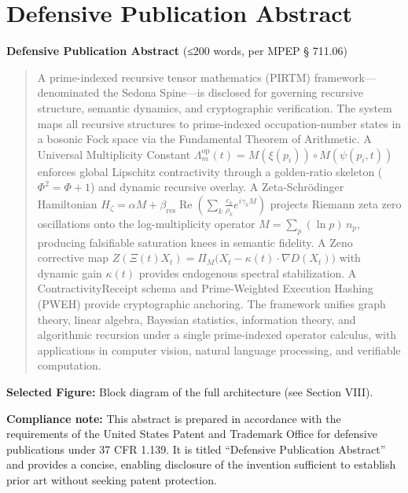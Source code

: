\documentclass[12pt]{article}
\theoremstyle{plain}
\theoremstyle{definition}
\theoremstyle{remark}
\begin{document}
\section{Defensive Publication Abstract}

\textbf{Defensive Publication Abstract} (≤200 words, per MPEP § 711.06)

\begin{quote}
A prime-indexed recursive tensor mathematics (PIRTM) framework—denominated the Sedona Spine—is disclosed for governing recursive structure, semantic dynamics, and cryptographic verification. The system maps all recursive structures to prime-indexed occupation-number states in a bosonic Fock space via the Fundamental Theorem of Arithmetic. A Universal Multiplicity Constant $\Lambda_m^{\text{op}}(t) = M(\xi(p_i)) \circ M(\psi(p_i,t))$ enforces global Lipschitz contractivity through a golden-ratio skeleton ($\Phi^2 = \Phi + 1$) and dynamic recursive overlay. A Zeta-Schrödinger Hamiltonian $H_\zeta = \alpha M + \beta_{\text{res}} \operatorname{Re}\left(\sum_k \frac{c_k}{\rho_k} e^{i\gamma_k M}\right)$ projects Riemann zeta zero oscillations onto the log-multiplicity operator $M = \sum_p (\ln p)\, n_p$, producing falsifiable saturation knees in semantic fidelity. A Zeno corrective map $Z(\Xi(t)X_t) = \Pi_M\bigl(X_t - \kappa(t)\cdot \nabla D(X_t)\bigr)$ with dynamic gain $\kappa(t)$ provides endogenous spectral stabilization. A ContractivityReceipt schema and Prime-Weighted Execution Hashing (PWEH) provide cryptographic anchoring. The framework unifies graph theory, linear algebra, Bayesian statistics, information theory, and algorithmic recursion under a single prime-indexed operator calculus, with applications in computer vision, natural language processing, and verifiable computation.
\end{quote}

\noindent
\textbf{Selected Figure:} Block diagram of the full architecture (see Section VIII).

\medskip
\noindent
\textbf{Compliance note:} This abstract is prepared in accordance with the requirements of the United States Patent and Trademark Office for defensive publications under 37 CFR 1.139. It is titled ``Defensive Publication Abstract'' and provides a concise, enabling disclosure of the invention sufficient to establish prior art without seeking patent protection.
\end{document}
